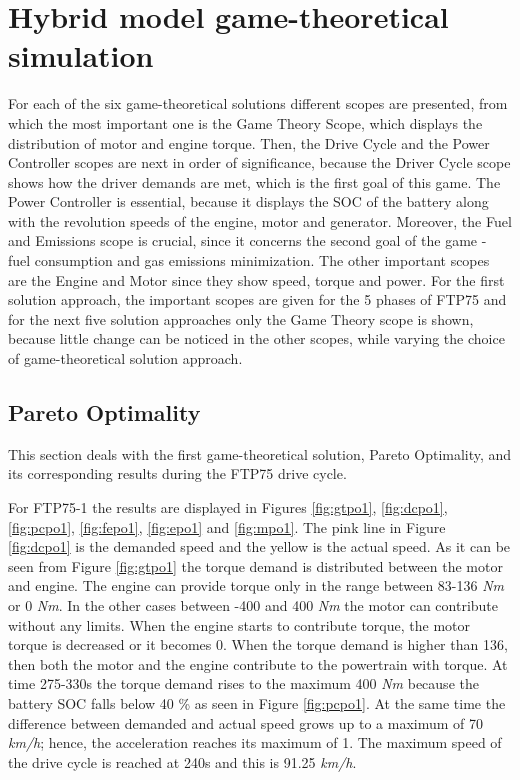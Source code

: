 \section{Hybrid model game-theoretical simulation}

For each of the six game-theoretical solutions different scopes are presented, from which the most important one is the Game Theory Scope, which displays the distribution of motor and engine torque. Then, the Drive Cycle and the Power Controller scopes are next in order of significance, because the Driver Cycle scope shows how the driver demands are met, which is the first goal of this game. The Power Controller is essential, because it displays the SOC of the battery along with the revolution speeds of the engine, motor and generator. Moreover, the Fuel and Emissions scope is crucial, since it concerns the second goal of the game - fuel consumption and gas emissions minimization. The other important scopes are the Engine and Motor since they show speed, torque and power. For the first solution approach, the important scopes are given for the 5 phases of FTP75 and for the next five solution approaches only the Game Theory scope is shown, because little change can be noticed in the other scopes, while varying the choice of game-theoretical solution approach.

\subsection{Pareto Optimality}
This section deals with the first game-theoretical solution, Pareto Optimality, and its corresponding results during the FTP75 drive cycle. 

For FTP75-1 the results are displayed in Figures \ref{fig:gtpo1}, \ref{fig:dcpo1}, \ref{fig:pcpo1}, \ref{fig:fepo1}, \ref{fig:epo1} and \ref{fig:mpo1}. The pink line in Figure \ref{fig:dcpo1} is the demanded speed and the yellow is the actual speed. As it can be seen from Figure \ref{fig:gtpo1} the torque demand is distributed between the motor and engine. The engine can provide torque only in the range between 83-136 \textit{Nm} or 0 \textit{Nm}. In the other cases between -400 and 400 \textit{Nm} the motor can contribute without any limits. When the engine starts to contribute torque, the motor torque is decreased or it becomes 0. When the torque demand is higher than 136, then both the motor and the engine contribute to the powertrain with torque. At time 275-330s the torque demand rises to the maximum 400 \textit{Nm} because the battery SOC falls below 40 \% as seen in Figure \ref{fig:pcpo1}. At the same time the difference between demanded and actual speed grows up to a maximum of 70 \textit{km/h}; hence, the acceleration reaches its maximum of 1. The maximum speed of the drive cycle is reached at 240s and this is 91.25 \textit{km/h}. 

